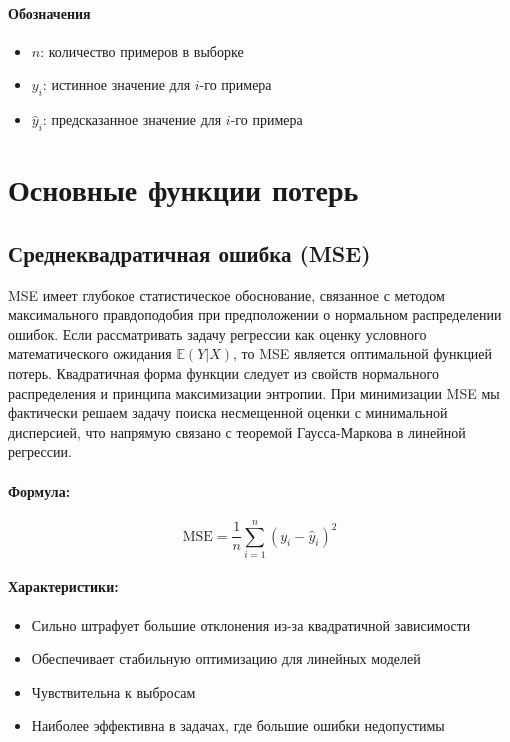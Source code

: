 \paragraph{Обозначения}
\begin{itemize}
    \item $n$: количество примеров в выборке
    \item $y_i$: истинное значение для $i$-го примера
    \item $\hat{y}_i$: предсказанное значение для $i$-го примера
\end{itemize}

\section{Основные функции потерь}


\subsection{Среднеквадратичная ошибка (MSE)}

MSE имеет глубокое статистическое обоснование, связанное с методом максимального правдоподобия при предположении о нормальном распределении ошибок. Если рассматривать задачу регрессии как оценку условного математического ожидания $\mathbb{E}(Y|X)$, то MSE является оптимальной функцией потерь. Квадратичная форма функции следует из свойств нормального распределения и принципа максимизации энтропии. При минимизации MSE мы фактически решаем задачу поиска несмещенной оценки с минимальной дисперсией, что напрямую связано с теоремой Гаусса-Маркова в линейной регрессии.

\paragraph{Формула:}
\begin{equation}
    \text{MSE} = \frac{1}{n} \sum_{i=1}^{n} (y_i - \hat{y}_i)^2
\end{equation}

\paragraph{Характеристики:}
\begin{itemize}
    \item Сильно штрафует большие отклонения из-за квадратичной зависимости
    \item Обеспечивает стабильную оптимизацию для линейных моделей
    \item Чувствительна к выбросам
    \item Наиболее эффективна в задачах, где большие ошибки недопустимы
\end{itemize}

